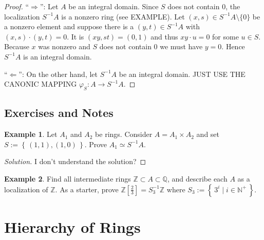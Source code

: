 \documentclass[a4paper]{book}
\theoremstyle{definition}
\newtheorem{example}{Example}[definition]
\newcommand{\set}[1]{\left\{\, #1 \,\right\}}
\newcommand{\makeset}[2]{\left\{\, #1 \mid #2 \,\right\}}
\begin{document}
\begin{proof}
    ``\(\Rightarrow\)'': Let \(A\) be an integral domain. Since \(S\) does not contain \(0\), the localization \(S^{-1}A\) is a nonzero ring (see EXAMPLE). Let \((x, s) \in S^{-1}A \setminus \{0\}\) be a nonzero element and suppose there is a \((y, t) \in S^{-1}A\) with \((x, s) \cdot (y, t) = 0\). It is \((xy, st) = (0, 1)\) and thus \(xy \cdot u = 0\) for some \(u \in S\). Because \(x\) was nonzero and \(S\) does not contain \(0\) we must have \(y = 0\). Hence \(S^{-1}A\) is an integral domain.

    ``\(\Leftarrow\)'': On the other hand, let \(S^{-1}A\) be an integral domain. JUST USE THE CANONIC MAPPING \(\varphi_S: A \longrightarrow S^{-1}A\).
\end{proof}

\section{Exercises and Notes}

\begin{example}
    Let \(A_1\) and \(A_2\) be rings. Consider \(A = A_1 \times A_2\) and set \(S := \set{(1, 1), (1, 0)}\). Prove \(A_1 \simeq S^{-1}A\).
\end{example}

\begin{proof}[Solution]
    I don't understand the solution?
\end{proof}


\begin{example}
    Find all intermediate rings \(\mathbb{Z} \subset A \subset \mathbb{Q}\), and describe each \(A\) as a localization of \(\mathbb{Z}\). As a starter, prove \(\mathbb{Z}\left[\frac{2}{3}\right] = S_3^{-1} \mathbb{Z}\) where \(S_3 := \makeset{3^i}{i \in \mathbb{N}^+}\).
\end{example}

\chapter{Hierarchy of Rings}
\end{document}
